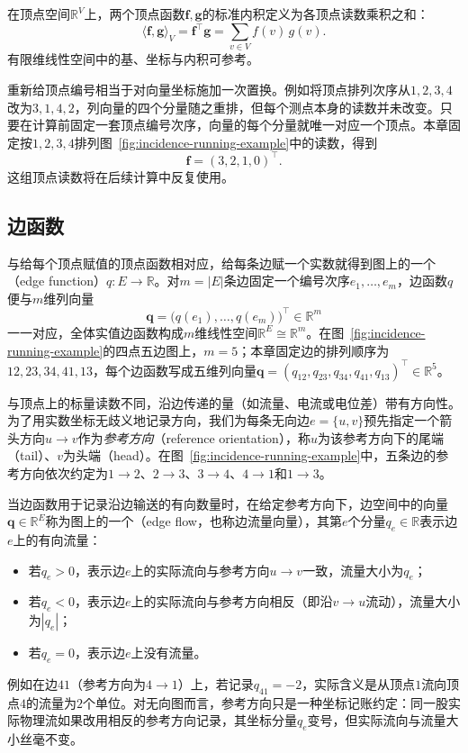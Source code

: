 在顶点空间$\mathbb{R}^V$上，两个顶点函数$\bm{f},\bm{g}$的标准内积定义为各顶点读数乘积之和：
\begin{equation}
\langle\bm{f},\bm{g}\rangle_V=\bm{f}^\top\bm{g}=\sum_{v\in V}f(v)\,g(v).
\label{eq:incidence-vertex-inner-product}
\end{equation}
有限维线性空间中的基、坐标与内积可参考。

重新给顶点编号相当于对向量坐标施加一次置换。例如将顶点排列次序从$1,2,3,4$改为$3,1,4,2$，列向量的四个分量随之重排，但每个测点本身的读数并未改变。只要在计算前固定一套顶点编号次序，向量的每个分量就唯一对应一个顶点。本章固定按$1,2,3,4$排列图~\ref{fig:incidence-running-example}中的读数，得到
\[
\bm{f}=(3,2,1,0)^\top.
\]
这组顶点读数将在后续计算中反复使用。

\subsection{边函数}
\label{sec:incidence-edge-functions}

与给每个顶点赋值的顶点函数相对应，给每条边赋一个实数就得到图上的一个（edge function）$q\colon E\to\mathbb{R}$。对$m=|E|$条边固定一个编号次序$e_1,\ldots,e_m$，边函数$q$便与$m$维列向量
\[
\bm{q}=\bigl(q(e_1),\ldots,q(e_m)\bigr)^\top\in\mathbb{R}^m
\]
一一对应，全体实值边函数构成$m$维线性空间$\mathbb{R}^E\cong\mathbb{R}^m$。在图~\ref{fig:incidence-running-example}的四点五边图上，$m=5$；本章固定边的排列顺序为$12,23,34,41,13$，每个边函数写成五维列向量$\bm{q}=(q_{12},q_{23},q_{34},q_{41},q_{13})^\top\in\mathbb{R}^5$。

与顶点上的标量读数不同，沿边传递的量（如流量、电流或电位差）带有方向性。为了用实数坐标无歧义地记录方向，我们为每条无向边$e=\{u,v\}$预先指定一个箭头方向$u\to v$作为\emph{参考方向}（reference orientation），称$u$为该参考方向下的尾端（tail）、$v$为头端（head）。在图~\ref{fig:incidence-running-example}中，五条边的参考方向依次约定为$1\to2$、$2\to3$、$3\to4$、$4\to1$和$1\to3$。

当边函数用于记录沿边输送的有向数量时，在给定参考方向下，边空间中的向量$\bm{q}\in\mathbb{R}^E$称为图上的一个（edge flow，也称边流量向量），其第$e$个分量$q_e\in\mathbb{R}$表示边$e$上的有向流量：
\begin{itemize}
\item 若$q_e>0$，表示边$e$上的实际流向与参考方向$u\to v$一致，流量大小为$q_e$；
\item 若$q_e<0$，表示边$e$上的实际流向与参考方向相反（即沿$v\to u$流动），流量大小为$|q_e|$；
\item 若$q_e=0$，表示边$e$上没有流量。
\end{itemize}
例如在边$41$（参考方向为$4\to1$）上，若记录$q_{41}=-2$，实际含义是从顶点$1$流向顶点$4$的流量为$2$个单位。对无向图而言，参考方向只是一种坐标记账约定：同一股实际物理流如果改用相反的参考方向记录，其坐标分量$q_e$变号，但实际流向与流量大小丝毫不变。

